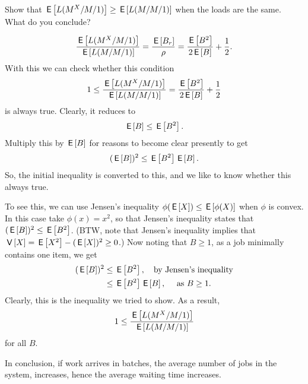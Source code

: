 \begin{exercise}
  Show that $\,\mathsf{E}\left[L(M^X/M/1)\right] \geq \,\mathsf{E}\left[L(M/M/1)\right]$ when the loads are the
    same. What do you conclude?
  \begin{solution}
    \begin{equation*}
    \frac{\,\mathsf{E}\left[L(M^X/M/1)\right]}{\,\mathsf{E}\left[L(M/M/1)\right]} = \frac{\,\mathsf{E}\left[B_r\right]}{\rho} = 
\frac{\,\mathsf{E}\left[B^2\right]}{2\,\mathsf{E}\left[B\right]} + \frac 12.
    \end{equation*}
With this we can check whether this condition
    \begin{equation*}
    1\leq \frac{\,\mathsf{E}\left[L(M^X/M/1)\right]}{\,\mathsf{E}\left[L(M/M/1)\right]} = \frac{\,\mathsf{E}\left[B^2\right]}{2\,\mathsf{E}\left[B\right]} + \frac 12
    \end{equation*}
    is always true. Clearly, it reduces to
\begin{equation*}
\,\mathsf{E}\left[B\right] \leq  \,\mathsf{E}\left[B^2\right].
\end{equation*}
Multiply this by $\,\mathsf{E}\left[B\right]$ for reasons to become clear presently to get
\begin{equation*}
(\,\mathsf{E}\left[B\right])^2 \leq  \,\mathsf{E}\left[B^2\right] \,\mathsf{E}\left[B\right].
\end{equation*}
So, the initial inequality is converted to this, and we like to know
whether this always true.


To see this, we can use Jensen's inequality
$\phi(\,\mathsf{E}\left[X\right]) \leq \,\mathsf{E}\left[\phi(X)\right]$ when $\phi$ is convex. In this case take
$\phi(x)=x^2$, so that Jensen's inequality states that
$(\,\mathsf{E}\left[B\right])^2 \leq \,\mathsf{E}\left[B^2\right]$. (BTW, note that Jensen's inequality implies
that $\,\mathsf{V}\left[X\right] = \,\mathsf{E}\left[X^2\right] - (\,\mathsf{E}\left[X\right])^2\geq 0$.)  Now noting that $B\geq 1$, as a
job minimally contains one item, we get
\begin{equation*}
  \begin{split}
(\,\mathsf{E}\left[B\right])^2 
&\leq  \,\mathsf{E}\left[B^2\right], \quad{\text{by Jensen's inequality}} \\
&\leq   \,\mathsf{E}\left[B^2\right] \,\mathsf{E}\left[B\right], \quad{\text{ as } B \geq 1}.
  \end{split}
\end{equation*}
Clearly, this is the inequality we tried to show. As a result,
    \begin{equation*}
    1\leq \frac{\,\mathsf{E}\left[L(M^X/M/1)\right]}{\,\mathsf{E}\left[L(M/M/1)\right]}
    \end{equation*}
for all $B$. 

In conclusion, if work arrives in batches, the average number of jobs
in the system, increases, hence the average waiting time increases.
  \end{solution}
\end{exercise}



